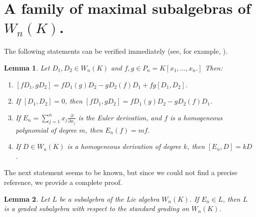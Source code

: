 \documentclass[12pt,a4paper]{amsart}
\theoremstyle{plain}
\newtheorem{lemma}{Lemma}
\theoremstyle{definition}
\begin{document}
\section{A family of maximal subalgebras of $W_n(K)$.}
The following statements can be verified immediately (see, for example,  \cite{Now}).

\begin{lemma} \label{lm:elem}
	Let $D_1, D_2 \in W_n(K)$ and $f, g \in P_n = K[x_1, \dots, x_n.]$ Then: 
	\begin{enumerate}
		\item $[f D_1, g D_2] = f D_1(g) D_2 - g D_2(f) D_1 + fg[D_1, D_2]$.
		\item If $[D_1, D_2] = 0$, then $[f D_1, g D_2] = f D_1(g) D_2 - g D_2(f) D_1$.
		\item If $E_n = \sum_{j=1}^{n} x_j \frac{\partial}{\partial x_j}$ is the Euler derivation, and $f$ is a homogeneous polynomial of degree $m$, then $E_n(f) = m f$.
		\item If $D \in W_n(K)$ is a homogeneous derivation of degree $k$, then $[E_n, D] = k D$.
	\end{enumerate}
\end{lemma}

The next statement seems to be known, but since we could not find a precise reference, we provide a complete proof.  

\begin{lemma} \label{lm:grading}
	Let $L$ be a subalgebra of the Lie algebra $W_n(K)$. If $E_n \in L$, then $L$ is a graded subalgebra with respect to the standard grading on $W_n(K)$.
\end{lemma}
\end{document}

